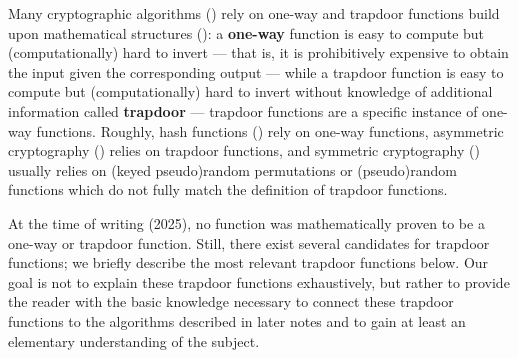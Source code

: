Many cryptographic algorithms () rely on one-way and trapdoor functions build upon mathematical structures (): a \textbf{one-way} function is easy to compute but (computationally) hard to invert --- that is, it is prohibitively expensive to obtain the input given the corresponding output --- while a trapdoor function is easy to compute but (computationally) hard to invert without knowledge of additional information called \textbf{trapdoor} --- trapdoor functions are a specific instance of one-way functions. Roughly, hash functions () rely on one-way functions, asymmetric cryptography () relies on trapdoor functions, and symmetric cryptography () usually relies on (keyed pseudo)random permutations or (pseudo)random functions which do not fully match the definition of trapdoor functions. 


At the time of writing (2025), no function was mathematically proven to be a one-way or trapdoor function. Still, there exist several candidates for trapdoor functions; we briefly describe the most relevant trapdoor functions below. Our goal is not to explain these trapdoor functions exhaustively, but rather to provide the reader with the basic knowledge necessary to connect these trapdoor functions to the algorithms described in later notes and to gain at least an elementary understanding of the subject.
